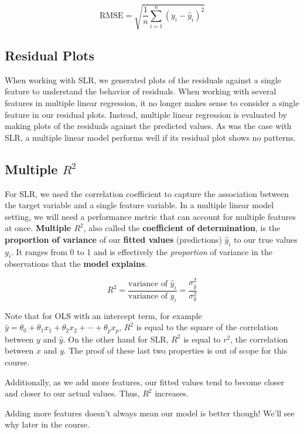 \documentclass[
  letterpaper,
  DIV=11,
  numbers=noendperiod]{scrreprt}
\begin{document}
\[\text{RMSE} = \sqrt{\frac{1}{n} \sum_{i=1}^n (y_i - \hat{y}_i)^2}\]

\subsection{Residual Plots}\label{residual-plots}

When working with SLR, we generated plots of the residuals against a
single feature to understand the behavior of residuals. When working
with several features in multiple linear regression, it no longer makes
sense to consider a single feature in our residual plots. Instead,
multiple linear regression is evaluated by making plots of the residuals
against the predicted values. As was the case with SLR, a multiple
linear model performs well if its residual plot shows no patterns.

\subsection{\texorpdfstring{Multiple
\(R^2\)}{Multiple R\^{}2}}\label{multiple-r2}

For SLR, we used the correlation coefficient to capture the association
between the target variable and a single feature variable. In a multiple
linear model setting, we will need a performance metric that can account
for multiple features at once. \textbf{Multiple \(R^2\)}, also called
the \textbf{coefficient of determination}, is the \textbf{proportion of
variance} of our \textbf{fitted values} (predictions) \(\hat{y}_i\) to
our true values \(y_i\). It ranges from 0 to 1 and is effectively the
\emph{proportion} of variance in the observations that the \textbf{model
explains}.

\[R^2 = \frac{\text{variance of } \hat{y}_i}{\text{variance of } y_i} = \frac{\sigma^2_{\hat{y}}}{\sigma^2_y}\]

Note that for OLS with an intercept term, for example
\(\hat{y} = \theta_0 + \theta_1x_1 + \theta_2x_2 + \cdots + \theta_px_p\),
\(R^2\) is equal to the square of the correlation between \(y\) and
\(\hat{y}\). On the other hand for SLR, \(R^2\) is equal to \(r^2\), the
correlation between \(x\) and \(y\). The proof of these last two
properties is out of scope for this course.

Additionally, as we add more features, our fitted values tend to become
closer and closer to our actual values. Thus, \(R^2\) increases.

Adding more features doesn't always mean our model is better though!
We'll see why later in the course.
\end{document}
